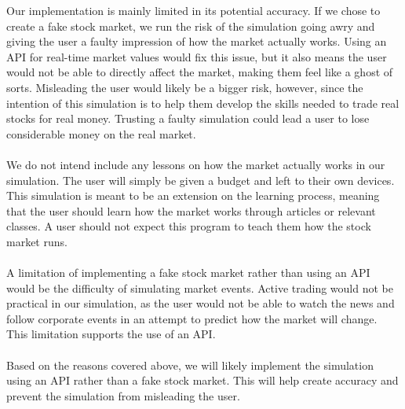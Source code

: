 \documentclass[12pt]{article}
\begin{document}
Our implementation is mainly limited in its potential accuracy. If we chose to create a fake stock market, we run the risk of the simulation going awry and giving the user a faulty impression of how the market actually works. Using an API for real-time market values would fix this issue, but it also means the user would not be able to directly affect the market, making them feel like a ghost of sorts. Misleading the user would likely be a bigger risk, however, since the intention of this simulation is to help them develop the skills needed to trade real stocks for real money. Trusting a faulty simulation could lead a user to lose considerable money on the real market. 
\\ \\
We do not intend include any lessons on how the market actually works in our simulation. The user will simply be given a budget and left to their own devices. This simulation is meant to be an extension on the learning process, meaning that the user should learn how the market works through articles or relevant classes. A user should not expect this program to teach them how the stock market runs.
\\ \\
A limitation of implementing a fake stock market rather than using an API would be the difficulty of simulating market events. Active trading would not be practical in our simulation, as the user would not be able to watch the news and follow corporate events in an attempt to predict how the market will change. This limitation supports the use of an API.
\\ \\
Based on the reasons covered above, we will likely implement the simulation using an API rather than a fake stock market. This will help create accuracy and prevent the simulation from misleading the user. 
\end{document}
